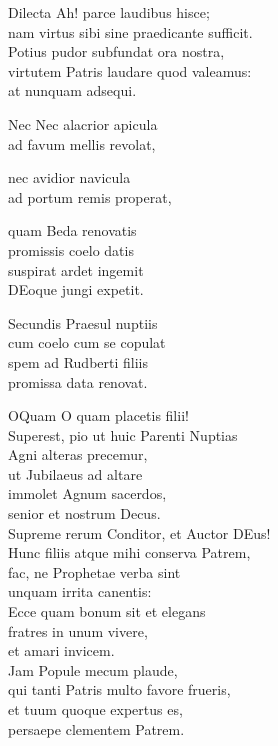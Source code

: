 \documentclass[tocstyle=ref-genre]{ees}
\begin{document}
{\begin{movement}{Dilecta}
  Ah! parce laudibus hisce;\\
  nam virtus sibi sine praedicante sufficit.\\
  Potius pudor subfundat ora nostra,\\
  virtutem Patris laudare quod valeamus:\\
  at nunquam adsequi.
\end{movement}

\begin{movement}{Nec}
  Nec alacrior apicula\\
  ad favum mellis revolat,

  nec avidior navicula\\
  ad portum remis properat,

  \voice[both]
  quam Beda renovatis\\
  promissis coelo datis\\
  suspirat ardet ingemit\\
  DEoque jungi expetit.

  Secundis Praesul nuptiis\\
  cum coelo cum se copulat\\
  spem ad Rudberti filiis\\
  promissa data renovat.
\end{movement}

\begin{movement}{OQuam}
  O quam placetis filii!\\
  Superest, pio ut huic Parenti Nuptias\\
  Agni alteras precemur,\\
  ut Jubilaeus ad altare\\
  immolet Agnum sacerdos,\\
  senior et nostrum Decus.\\
  Supreme rerum Conditor, et Auctor DEus!\\
  Hunc filiis atque mihi conserva Patrem,\\
  fac, ne Prophetae verba sint\\
  unquam irrita canentis:\\
  Ecce quam bonum sit et elegans\\
  fratres in unum vivere,\\
  et amari invicem.\\
  Jam Popule mecum plaude,\\
  qui tanti Patris multo favore frueris,\\
  et tuum quoque expertus es,\\
  persaepe clementem Patrem.
\end{movement}

}
\end{document}
